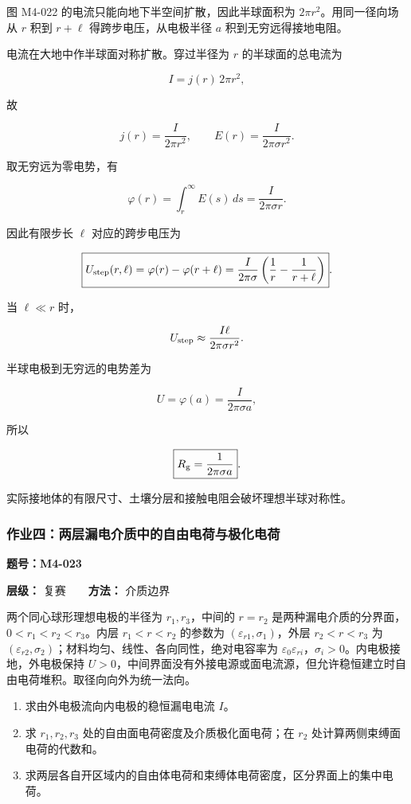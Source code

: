 图 M4-022 的电流只能向地下半空间扩散，因此半球面积为
\(2\pi r^2\)。用同一径向场从 \(r\) 积到 \(r+\ell\)
得跨步电压，从电极半径 \(a\) 积到无穷远得接地电阻。

电流在大地中作半球面对称扩散。穿过半径为 \(r\) 的半球面的总电流为

\[
I=j(r)\,2\pi r^2,
\]

故

\[
\boxed{
j(r)=\frac{I}{2\pi r^2},
\qquad
E(r)=\frac{I}{2\pi\sigma r^2}
}.
\]

取无穷远为零电势，有

\[
\varphi(r)=\int_r^{\infty} E(s)\,ds
=\frac{I}{2\pi\sigma r}.
\]

因此有限步长 \(\ell\) 对应的跨步电压为

\[
\boxed{
U_{\rm step}(r,\ell)
=\varphi(r)-\varphi(r+\ell)
=\frac{I}{2\pi\sigma}
\left(\frac1r-\frac1{r+\ell}\right)
}.
\]

当 \(\ell\ll r\) 时，

\[
U_{\rm step}\approx\frac{I\ell}{2\pi\sigma r^2}.
\]

半球电极到无穷远的电势差为

\[
U=\varphi(a)=\frac{I}{2\pi\sigma a},
\]

所以

\[
\boxed{R_{\rm g}=\frac{1}{2\pi\sigma a}}.
\]

实际接地体的有限尺寸、土壤分层和接触电阻会破坏理想半球对称性。

\par{}
\noindent\begin{minipage}{\linewidth}

\subsubsection{作业四：两层漏电介质中的自由电荷与极化电荷}\label{m4:ux4f5cux4e1aux56dbux4e24ux5c42ux6f0fux7535ux4ecbux8d28ux4e2dux7684ux81eaux7531ux7535ux8377ux4e0eux6781ux5316ux7535ux8377}

\textbf{题号：M4-023}

\textbf{层级：} 复赛　　\textbf{方法：} 介质边界

两个同心球形理想电极的半径为 \(r_1,r_3\)，中间的 \(r=r_2\)
是两种漏电介质的分界面，\(0<r_1<r_2<r_3\)。内层 \(r_1<r<r_2\) 的参数为
\((\varepsilon_{r1},\sigma_1)\)，外层 \(r_2<r<r_3\) 为
\((\varepsilon_{r2},\sigma_2)\)；材料均匀、线性、各向同性，绝对电容率为
\(\varepsilon_0\varepsilon_{ri}\)，\(\sigma_i>0\)。内电极接地，外电极保持
\(U>0\)，中间界面没有外接电源或面电流源，但允许稳恒建立时自由电荷堆积。取径向向外为统一法向。

\begin{enumerate}
\def\labelenumi{(\arabic{enumi})}
\item
  求由外电极流向内电极的稳恒漏电电流 \(I\)。
\item
  求 \(r_1,r_2,r_3\) 处的自由面电荷密度及介质极化面电荷；在 \(r_2\)
  处计算两侧束缚面电荷的代数和。
\item
  求两层各自开区域内的自由体电荷和束缚体电荷密度，区分界面上的集中电荷。
\end{enumerate}

\end{minipage}\par

